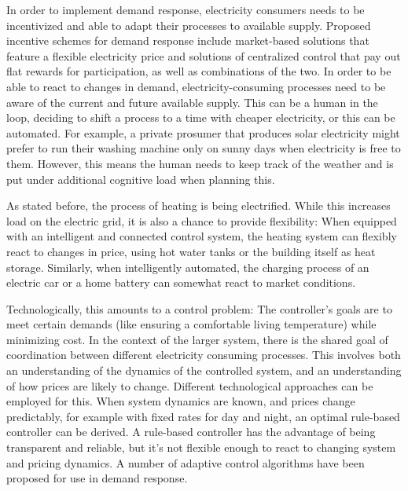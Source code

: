 In order to implement demand response, electricity consumers needs to be incentivized and able to adapt their processes to available supply.
Proposed incentive schemes for demand response include market-based solutions that feature a flexible electricity price and solutions of centralized control that pay out flat rewards for participation, as well as combinations of the two. 
In order to be able to react to changes in demand, electricity-consuming processes need to be aware of the current and future available supply.
This can be a human in the loop, deciding to shift a process to a time with cheaper electricity, or this can be automated.
For example, a private prosumer that produces solar electricity might prefer to run their washing machine only on sunny days when electricity is free to them.
However, this means the human needs to keep track of the weather and is put under additional cognitive load when planning this.

As stated before, the process of heating is being electrified.
While this increases load on the electric grid, it is also a chance to provide flexibility:
When equipped with an intelligent and connected control system, the heating system can flexibly react to changes in price, using hot water tanks or the building itself as heat storage.
Similarly, when intelligently automated, the charging process of an electric car or a home battery can somewhat react to market conditions.

Technologically, this amounts to a control problem:
The controller's goals are to meet certain demands (like ensuring a comfortable living temperature) while minimizing cost. In the context of the larger system, there is the shared goal of coordination between different electricity consuming processes.
This involves both an understanding of the dynamics of the controlled system, and an understanding of how prices are likely to change.
Different technological approaches can be employed for this.
When system dynamics are known, and prices change predictably, for example with fixed rates for day and night, an optimal rule-based controller can be derived. 
A rule-based controller has the advantage of being transparent and reliable, but it's not flexible enough to react to changing system and pricing dynamics.
A number of adaptive control algorithms have been proposed for use in demand response. 


